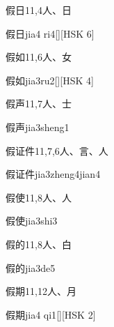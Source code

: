 \begin{Entry}{假日}{11,4}{⼈、⽇}
  \begin{Phonetics}{假日}{jia4 ri4}[][HSK 6]
  \end{Phonetics}
\end{Entry}

\begin{Entry}{假如}{11,6}{⼈、⼥}
  \begin{Phonetics}{假如}{jia3ru2}[][HSK 4]
  \end{Phonetics}
\end{Entry}

\begin{Entry}{假声}{11,7}{⼈、⼠}
  \begin{Phonetics}{假声}{jia3sheng1}
  \end{Phonetics}
\end{Entry}

\begin{Entry}{假证件}{11,7,6}{⼈、⾔、⼈}
  \begin{Phonetics}{假证件}{jia3zheng4jian4}
  \end{Phonetics}
\end{Entry}

\begin{Entry}{假使}{11,8}{⼈、⼈}
  \begin{Phonetics}{假使}{jia3shi3}
  \end{Phonetics}
\end{Entry}

\begin{Entry}{假的}{11,8}{⼈、⽩}
  \begin{Phonetics}{假的}{jia3de5}
  \end{Phonetics}
\end{Entry}

\begin{Entry}{假期}{11,12}{⼈、⽉}
  \begin{Phonetics}{假期}{jia4 qi1}[][HSK 2]
  \end{Phonetics}
\end{Entry}

